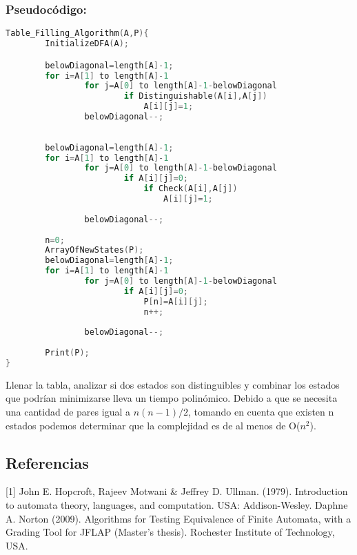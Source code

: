 \documentclass[12pt]{article}
\begin{document}
\newpage
\subsubsection{Pseudoc\'odigo:}
\begin{lstlisting}[language=c++]
Table_Filling_Algorithm(A,P){
        InitializeDFA(A);

        belowDiagonal=length[A]-1;
        for i=A[1] to length[A]-1
                for j=A[0] to length[A]-1-belowDiagonal
                        if Distinguishable(A[i],A[j])
                            A[i][j]=1;
                belowDiagonal--;
                
        
        belowDiagonal=length[A]-1;
        for i=A[1] to length[A]-1
                for j=A[0] to length[A]-1-belowDiagonal
                        if A[i][j]=0;
                            if Check(A[i],A[j])
                                A[i][j]=1;
                            
                belowDiagonal--;
                
        n=0;
        ArrayOfNewStates(P);
        belowDiagonal=length[A]-1;
        for i=A[1] to length[A]-1
                for j=A[0] to length[A]-1-belowDiagonal
                        if A[i][j]=0;
                            P[n]=A[i][j];
                            n++;
                            
                belowDiagonal--;
                
        Print(P);
}

\end{lstlisting}

Llenar la tabla, analizar si dos estados son distinguibles y combinar los estados que podrían minimizarse lleva un tiempo polinómico. Debido a que se necesita una cantidad de pares igual a $n(n-1)/2$, tomando en cuenta que existen n estados podemos determinar que la complejidad es de al menos de O($n^2$).
\newline

\subsection{Referencias}

[1] John E. Hopcroft, Rajeev Motwani & Jeffrey D. Ullman. (1979). Introduction to automata theory, languages, and computation. USA: Addison-Wesley.
\newline
\newline
[2] Daphne A. Norton (2009). Algorithms for Testing Equivalence of Finite
Automata, with a Grading Tool for JFLAP (Master's thesis). Rochester Institute of Technology, USA.
\end{document}
